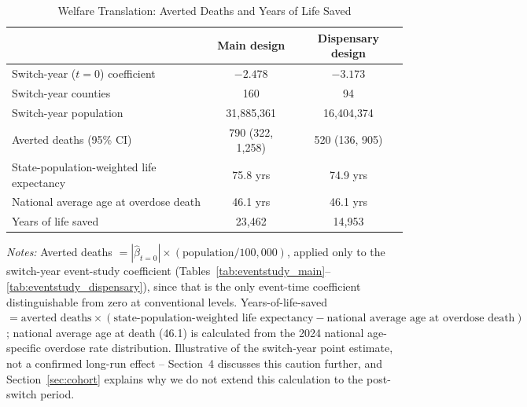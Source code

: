 \begin{table}[htbp]
\centering
\caption{Welfare Translation: Averted Deaths and Years of Life Saved}
\label{tab:welfare}
\begin{tabular}{lcc}
\toprule
 & Main design & Dispensary design \\
\midrule
Switch-year ($t=0$) coefficient          & $-2.478$          & $-3.173$ \\
Switch-year counties                     & 160               & 94 \\
Switch-year population                   & 31{,}885{,}361    & 16{,}404{,}374 \\
Averted deaths (95\% CI)                 & 790 (322, 1{,}258) & 520 (136, 905) \\
State-population-weighted life expectancy & 75.8 yrs          & 74.9 yrs \\
National average age at overdose death   & 46.1 yrs          & 46.1 yrs \\
Years of life saved                      & 23{,}462          & 14{,}953 \\
\bottomrule
\end{tabular}
\begin{minipage}{0.92\textwidth}
\vspace{0.3em}
\footnotesize
\textit{Notes:} Averted deaths $= |\hat\beta_{t=0}| \times (\text{population}/100{,}000)$, applied only to the
switch-year event-study coefficient (Tables~\ref{tab:eventstudy_main}--\ref{tab:eventstudy_dispensary}), since that
is the only event-time coefficient distinguishable from zero at conventional levels. Years-of-life-saved
$= \text{averted deaths} \times (\text{state-population-weighted life expectancy} - \text{national average age at
overdose death})$; national average age at death (46.1) is calculated from the 2024 national age-specific overdose
rate distribution. Illustrative of the switch-year point estimate, not a confirmed long-run effect -- Section~4
discusses this caution further, and Section~\ref{sec:cohort} explains why we do not extend this calculation to
the post-switch period.
\end{minipage}
\end{table}
